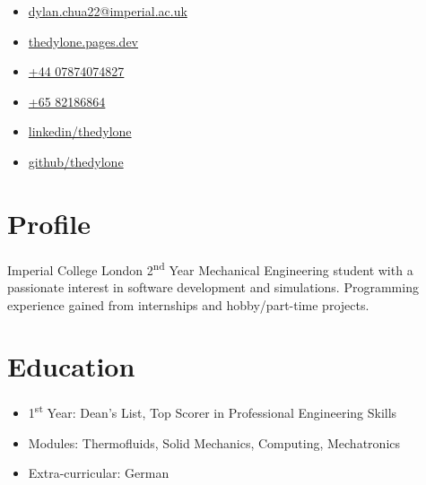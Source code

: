 \documentclass{cv}
\begin{document}
\begin{minipage}[h]{.33\textwidth-0.33\margin}
    \begin{itemize}
    \setlength{\itemsep}{0.5em}
        \item[\Large\faAt] \href{mailto:dylan.chua22@imperial.ac.uk}{dylan.chua22@imperial.ac.uk}
        \item[\Large\faLaptop] \href{https://thedylone.pages.dev}{thedylone.pages.dev}
    \end{itemize}
\end{minipage}
\hfill
\begin{minipage}[h]{.33\textwidth-0.33\margin}
    \vspace{0.5em}
    \begin{itemize}
    \centering
    \setlength{\itemsep}{0.5em}
        \item[\Large\faMobile] \href{tel:4407874074827}{+44 07874074827} 
        \item[\Large\faMobile] \href{tel:6582186864}{+65 82186864}
    \end{itemize}
\end{minipage}
\hfill
\begin{minipage}[h]{.33\textwidth-0.33\margin}
    \vspace{0.5em}
    \begin{itemize}
    \raggedleft
    \setlength{\itemsep}{0.5em}
        \item[\Large\faLinkedinSquare] \href{https://www.linkedin.com/in/thedylone/}{linkedin/thedylone}
        \item[\Large\faGithub] \href{https://github.com/thedylone}{github/thedylone}
    \end{itemize}
\end{minipage}

\section{Profile}
\raggedright
Imperial College London 2\textsuperscript{nd} Year Mechanical Engineering student with a passionate interest in software development and simulations. Programming experience gained from internships and hobby/part-time projects. 

\section{Education}
\begin{subsections}
    \subtitle{MEng Mechanical Engineering \hfill London, United Kingdom}
    \item{}
    \begin{itemize}
        \item 1\textsuperscript{st} Year: Dean's List, Top Scorer in Professional Engineering Skills
        \item Modules: Thermofluids, Solid Mechanics, Computing, Mechatronics
        \item Extra-curricular: German
    \end{itemize}
\end{subsections}
\end{document}
